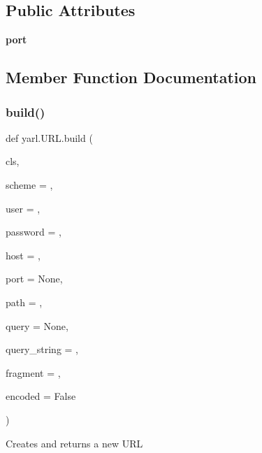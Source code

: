 \subsection*{Public Attributes}
\begin{DoxyCompactItemize}
\item 
\mbox{\label{classyarl_1_1_u_r_l_a5d09aaaf21754065174432f1a3b143bf}} 
{\bfseries port}
\end{DoxyCompactItemize}


\subsection{Member Function Documentation}
\mbox{\label{classyarl_1_1_u_r_l_a1c2c69661e6243b26ced0c91bcbba17f}} 
\subsubsection{\texorpdfstring{build()}{build()}}
{\footnotesize\ttfamily def yarl.\+U\+R\+L.\+build (\begin{DoxyParamCaption}\item[{}]{cls,  }\item[{}]{scheme = {\ttfamily \textquotesingle{}\textquotesingle{}},  }\item[{}]{user = {\ttfamily \textquotesingle{}\textquotesingle{}},  }\item[{}]{password = {\ttfamily \textquotesingle{}\textquotesingle{}},  }\item[{}]{host = {\ttfamily \textquotesingle{}\textquotesingle{}},  }\item[{}]{port = {\ttfamily None},  }\item[{}]{path = {\ttfamily \textquotesingle{}\textquotesingle{}},  }\item[{}]{query = {\ttfamily None},  }\item[{}]{query\+\_\+string = {\ttfamily \textquotesingle{}\textquotesingle{}},  }\item[{}]{fragment = {\ttfamily \textquotesingle{}\textquotesingle{}},  }\item[{}]{encoded = {\ttfamily False} }\end{DoxyParamCaption})}

\begin{DoxyVerb}Creates and returns a new URL\end{DoxyVerb}
 \mbox{\label{classyarl_1_1_u_r_l_a50c3724e1a627325be8f496cda2f613b}} 

